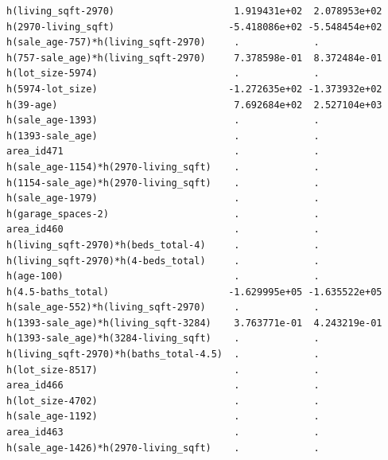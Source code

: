 \documentclass[
]{article}
\begin{document}
\begin{verbatim}
h(living_sqft-2970)                     1.919431e+02  2.078953e+02
h(2970-living_sqft)                    -5.418086e+02 -5.548454e+02
h(sale_age-757)*h(living_sqft-2970)     .             .           
h(757-sale_age)*h(living_sqft-2970)     7.378598e-01  8.372484e-01
h(lot_size-5974)                        .             .           
h(5974-lot_size)                       -1.272635e+02 -1.373932e+02
h(39-age)                               7.692684e+02  2.527104e+03
h(sale_age-1393)                        .             .           
h(1393-sale_age)                        .             .           
area_id471                              .             .           
h(sale_age-1154)*h(2970-living_sqft)    .             .           
h(1154-sale_age)*h(2970-living_sqft)    .             .           
h(sale_age-1979)                        .             .           
h(garage_spaces-2)                      .             .           
area_id460                              .             .           
h(living_sqft-2970)*h(beds_total-4)     .             .           
h(living_sqft-2970)*h(4-beds_total)     .             .           
h(age-100)                              .             .           
h(4.5-baths_total)                     -1.629995e+05 -1.635522e+05
h(sale_age-552)*h(living_sqft-2970)     .             .           
h(1393-sale_age)*h(living_sqft-3284)    3.763771e-01  4.243219e-01
h(1393-sale_age)*h(3284-living_sqft)    .             .           
h(living_sqft-2970)*h(baths_total-4.5)  .             .           
h(lot_size-8517)                        .             .           
area_id466                              .             .           
h(lot_size-4702)                        .             .           
h(sale_age-1192)                        .             .           
area_id463                              .             .           
h(sale_age-1426)*h(2970-living_sqft)    .             .           
                                                                  

\end{verbatim}
\end{document}
